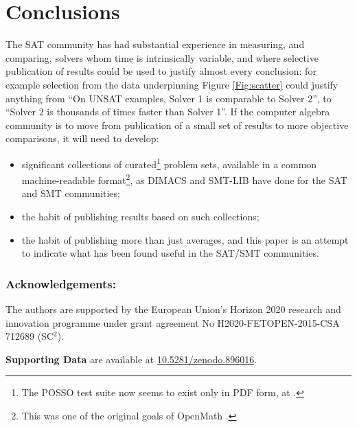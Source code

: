 \documentclass{easychair}
\begin{document}
\section{Conclusions}
The SAT community has had substantial experience in measuring, and comparing, solvers whom time is intrinsically variable, and where selective publication of results could be used to justify almost every conclusion: for example selection from the data underpinning Figure \ref{Fig:scatter} could justify anything from ``On UNSAT examples, Solver 1 is comparable to Solver 2'', to ``Solver 2 is thousands of times faster than Solver 1''. If the computer algebra community is to move from publication of a small set of results to more objective comparisons, it will need to develop:
\begin{itemize}
\item significant collections of curated\footnote{The POSSO test suite now seems to exist only in PDF form, at \cite{BiniMourrain1996}.} problem sets, available in a common machine-readable format\footnote{This was one of the original goals of OpenMath \cite{Abbottetal1996}.}, as DIMACS \cite{Spence2015a} and SMT-LIB \cite{Barrettetal2015b} have done for the SAT and SMT communities;
\item the habit of publishing results based on such collections;
\item the habit of publishing more than just averages, and this paper is an attempt to indicate what has been found useful in the SAT/SMT communities.
\end{itemize}
\subsubsection*{Acknowledgements:}

The authors are supported by the European Union's Horizon 2020 research and innovation programme under grant agreement No H2020-FETOPEN-2015-CSA 712689 (\textsf{SC}$^2$). 
\par
{\bf Supporting Data} are available at \url{10.5281/zenodo.896016}.

\end{document}
